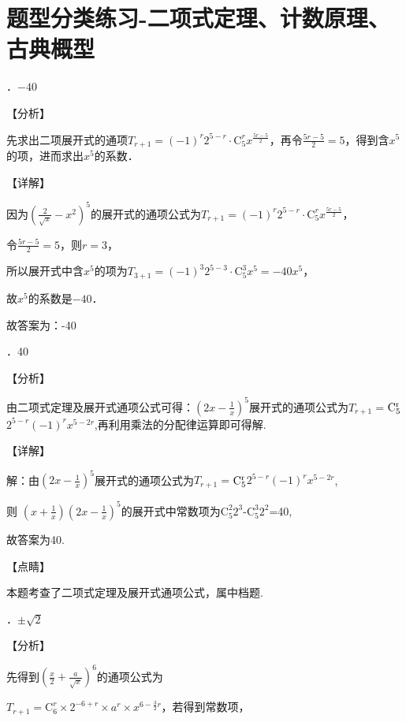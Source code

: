 ﻿
\section{题型分类练习-二项式定理、计数原理、古典概型}

．$-40$

\noindent 【分析】

\noindent 先求出二项展开式的通项$T_{r+1} =\left(-1\right)^{r} 2^{5-r} \cdot \mathrm C_{5}^{r} x^{\frac{5r-5}{2} } $，再令$\frac{5r-5}{2} =5$，得到含$x^{5} $的项，进而求出$x^{5} $的系数．

\noindent 【详解】

\noindent 因为$\left(\frac{2}{\sqrt{x} } -x^{2} \right)^{5} $的展开式的通项公式为$T_{r+1} =\left(-1\right)^{r} 2^{5-r} \cdot \mathrm C_{5}^{r} x^{\frac{5r-5}{2} } $，

\noindent 令$\frac{5r-5}{2} =5$，则$r=3$，

\noindent 所以展开式中含$x^{5} $的项为$T_{3+1} =\left(-1\right)^{3} 2^{5-3} \cdot \mathrm C_{5}^{3} x^{5} =-40x^{5} $，

\noindent 故$x^{5} $的系数是$-40$．

\noindent 故答案为：-40

．40

\noindent 【分析】

\noindent 由二项式定理及展开式通项公式可得：$\left(2x-\frac{1}{x} \right)^{5} $展开式的通项公式为$T_{r+1} =$$\mathrm C_{5}^{{\rm r}} $$2^{5-r} $$(-1)^{r} $$x^{5-2r} $,再利用乘法的分配律运算即可得解.

\noindent 【详解】

\noindent 解：由$\left(2x-\frac{1}{x} \right)^{5} $展开式的通项公式为$T_{r+1} =$$\mathrm C_{5}^{{\rm r}} $$2^{5-r} $$(-1)^{r} $$x^{5-2r} $,

\noindent 则 $\left(x+\frac{1}{x} \right)\left(2x-\frac{1}{x} \right)^{5} $的展开式中常数项为$\mathrm C_{5}^{2} $$2^{3} $-$\mathrm C_{5}^{3} $$2^{2} $=40,

\noindent 故答案为40.

\noindent 【点睛】

\noindent 本题考查了二项式定理及展开式通项公式，属中档题.

．$\pm \sqrt{2} $

\noindent 【分析】

\noindent 先得到$\left(\frac{x}{2} +\frac{a}{\sqrt{x} } \right)^{6} $的通项公式为

\noindent $T_{r+1} =$$\mathrm C_{6}^{r} \times 2^{-6+r} \times a^{r} \times x^{6-\frac{3}{2} r} $，若得到常数项，

